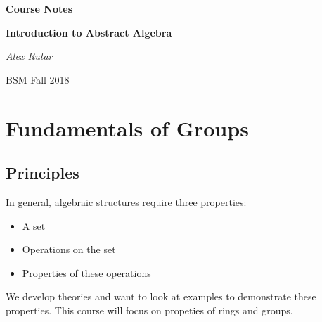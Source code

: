 \documentclass[12pt, a4paper]{book}
\theoremstyle{nonumberplain}
\newcommand{\assignmentname}{Course Notes}
\newcommand{\classname}{Introduction to Abstract Algebra}
\newcommand{\semester}{BSM Fall 2018}
\begin{document}
\begin{titlepage}
    \centering
    \vspace{5cm}
    {\huge\textbf{\assignmentname}\par} %
    \vspace{2cm}
    {\Large\textbf{\classname}\par} %
    \vspace{3cm}
    {\Large\textit{Alex Rutar}\par}

    \vfill

    {\large \semester \par} %
\end{titlepage}
{}
\tableofcontents
{}
\chapter{Fundamentals of Groups}
\section{Principles}
In general, algebraic structures require three properties:
\begin{itemize}
    \item A set
    \item Operations on the set
    \item Properties of these operations
\end{itemize}
We develop theories and want to look at examples to demonstrate these properties.
This course will focus on propeties of rings and groups.
\end{document}
